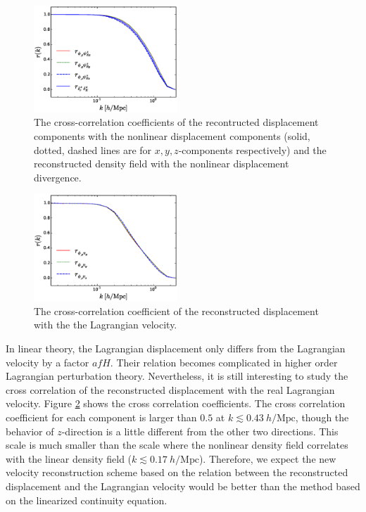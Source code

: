 \documentclass[aps,prx,twocolumn,superscriptaddress,groupedaddress,nofootinbib,amsfont]{revtex4}  %
\newcommand{\mr}{\mathrm}
\begin{document}
\begin{figure}[tbp]
\begin{center}
\includegraphics[width=0.48\textwidth]{fb.eps}
\end{center}
\vspace{-0.7cm}
\caption{The cross-correlation coefficients of the recontructed displacement
    components with the nonlinear displacement components (solid, dotted, dashed
    lines are for $x,y,z$-components respectively) and the reconstructed
density field with the nonlinear displacement divergence.}
\label{fig:cc_disp}
\end{figure}

\begin{figure}[tbp]
\begin{center}
\includegraphics[width=0.48\textwidth]{fc.eps}
\end{center}
\vspace{-0.7cm}
\caption{The cross-correlation coefficient of the reconstructed displacement
with the the Lagrangian velocity.}
\label{fig:cc_vel}
\end{figure}

In linear theory, the Lagrangian displacement only differs from the Lagrangian 
velocity by a factor $afH$. Their relation becomes complicated in higher order
Lagrangian perturbation theory. 
Nevertheless, it is still interesting to study the cross correlation of the 
reconstructed displacement with the real Lagrangian velocity.
Figure \ref{fig:cc_vel} shows the cross correlation coefficients. 
The cross correlation coefficient for each component is larger than $0.5$ at
$k\lesssim0.43\ h/\mr{Mpc}$, though the behavior of $z$-direction is a little
different from the other two directions.
This scale is much smaller than the scale where the nonlinear density field 
correlates with the linear density field ($k\lesssim0.17\ h/\mr{Mpc}$).
Therefore, we expect the new velocity reconstruction scheme based on the 
relation between the reconstructed displacement and the Lagrangian velocity
would be better than the method based on the linearized continuity equation.
\end{document}
